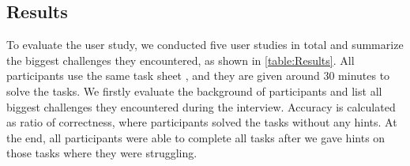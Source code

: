 \subsection{Results}
To evaluate the user study, we conducted five user studies in total and summarize the biggest challenges they encountered, as shown in \ref{table:Results}.
All participants use the same task sheet , and they are given around 30 minutes to solve the tasks.
We firstly evaluate the background of participants and list all biggest challenges they encountered during the interview.
Accuracy is calculated as ratio of correctness, where participants solved the tasks without any hints.
At the end, all participants were able to complete all tasks after we gave hints on those tasks where they were struggling.
